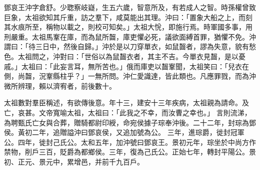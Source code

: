 \begin{pinyinscope}
 
 
 鄧哀王沖字倉舒。少聦察岐嶷，生五六歲，智意所及，有若成人之智。時孫權曾致巨象，太祖欲知其斤重，訪之羣下，咸莫能出其理。沖曰：「置象大船之上，而刻其水痕所至，稱物以載之，則校可知矣。」太祖大恱，即施行焉。時軍國多事，用刑嚴重。太祖馬鞌在庫，而為鼠所齧，庫吏懼必死，議欲面縛首罪，猶懼不免。沖謂曰：「待三日中，然後自歸。」沖於是以刀穿單衣，如鼠齧者，謬為失意，貌有愁色。太祖問之，沖對曰：「世俗以為鼠齧衣者，其主不吉。今單衣見齧，是以憂戚。」太祖曰：「此妄言耳，無所苦也。」俄而庫吏以齧鞌聞，太祖笑曰：「兒衣在側，尚齧，況鞌縣柱乎？」一無所問。沖仁愛識達，皆此類也。凡應罪戮，而為沖微所辨理，賴以濟宥者，前後數十。
 
 
 太祖數對羣臣稱述，有欲傳後意。年十三，建安十三年疾病，太祖親為請命。及亡，哀甚。文帝寬喻太祖，太祖曰：「此我之不幸，而汝曹之幸也。」
 言則流涕，為聘甄氏亡女與合葬，贈騎都尉印綬，命宛侯據子琮奉沖後。二十二年，封琮為鄧侯。黃初二年，追贈謚沖曰鄧哀侯，又追加號為公。
 三年，進琮爵，徙封冠軍公。四年，徙封己氏公。太和五年，加沖號曰鄧哀王。景初元年，琮坐於中尚方作禁物，削戶三百，貶爵為都鄉侯。三年，復為己氏公。正始七年，轉封平陽公。景初、正元、景元中，累增邑，并前千九百戶。
 
 
\end{pinyinscope}